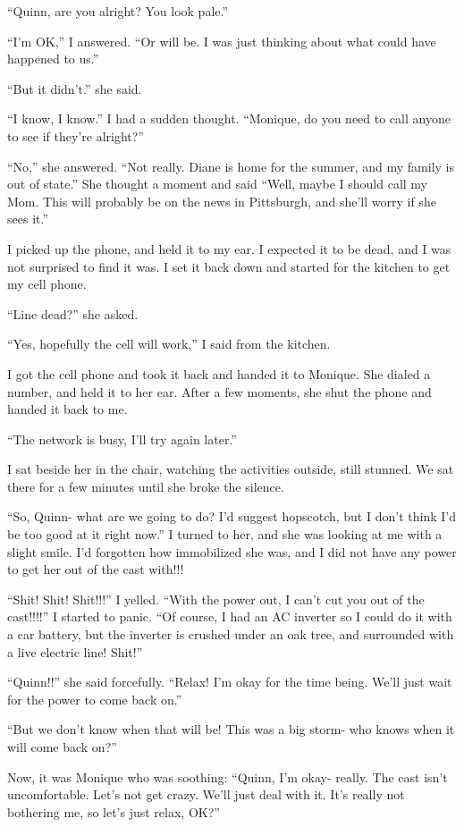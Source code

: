 ``Quinn, are you alright? You look pale.''

``I'm OK,'' I answered. ``Or will be. I was just thinking about what could have happened to
us.''

``But it didn't.'' she said.

``I know, I know.'' I had a sudden thought. ``Monique, do you need to call anyone to see if
they're alright?''

``No,'' she answered. ``Not really. Diane is home for the summer, and my family is out of
state.'' She thought a moment and said ``Well, maybe I should call my Mom. This will probably be
on the news in Pittsburgh, and she'll worry if she sees it.''

I picked up the phone, and held it to my ear. I expected it to be dead, and I was not
surprised to find it was. I set it back down and started for the kitchen to get my cell phone.

``Line dead?'' she asked.

``Yes, hopefully the cell will work,'' I said from the kitchen.

I got the cell phone and took it back and handed it to Monique. She dialed a number, and
held it to her ear. After a few moments, she shut the phone and handed it back to me.

``The network is busy, I'll try again later.''

I sat beside her in the chair, watching the activities outside, still stunned. We sat there
for a few minutes until she broke the silence.

``So, Quinn- what are we going to do? I'd suggest hopscotch, but I don't think I'd be too
good at it right now.'' I turned to her, and she was looking at me with a slight smile. I'd
forgotten how immobilized she was, and I did not have any power to get her out of the cast
with!!!

``Shit! Shit! Shit!!!'' I yelled. ``With the power out, I can't cut you out of the
cast!!!!'' I started to panic. ``Of course, I had an AC inverter so I could do it with a car
battery, but the inverter is crushed under an oak tree, and surrounded with a live electric
line! Shit!''

``Quinn!!'' she said forcefully. ``Relax! I'm okay for the time being. We'll just wait for
the power to come back on.''

``But we don't know when that will be! This was a big storm- who knows when it will come
back on?''

Now, it was Monique who was soothing: ``Quinn, I'm okay- really. The cast isn't
uncomfortable. Let's not get crazy. We'll just deal with it. It's really not bothering me, so
let's just relax, OK?''


